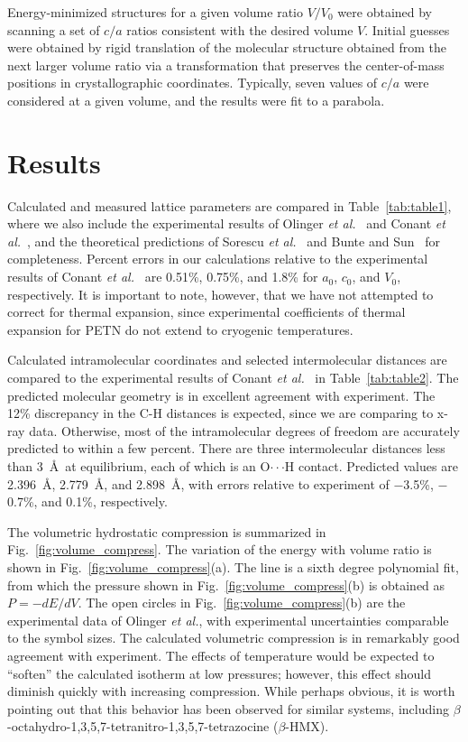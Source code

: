\documentclass[prb,aps,nobibnotes,twocolumn,doublespace,twocolumngrid,superbib]{revtex4}
\begin{document}
Energy-minimized structures for a given volume ratio $V/V_0$ were
obtained by scanning a set of $c/a$ ratios consistent with the desired
volume $V$.  Initial guesses were obtained by rigid translation of the
molecular structure obtained from the next larger volume ratio via a
transformation that preserves the center-of-mass positions in
crystallographic coordinates.  Typically, seven values of $c/a$ were
considered at a given volume, and the results were fit to a parabola.

\section{Results}
\label{sec:results}
Calculated and measured lattice parameters are compared in
Table~\ref{tab:table1}, where we also include the experimental results
of Olinger {\it et al.}~\cite{Olinger_1975v62} and Conant {\it et
al.}~\cite{Conant_1979}, and the theoretical predictions of Sorescu
{\it et al.}~\cite{Sorescu_1999v103} and Bunte and
Sun~\cite{Bunte_2000v104} for completeness.  Percent errors in our
calculations relative to the experimental results of Conant {\it et
al.}~\cite{Conant_1979} are 0.51\%, 0.75\%, and 1.8\% for $a_0$,
$c_0$, and $V_0$, respectively.  It is important to note, however,
that we have not attempted to correct for thermal expansion, since
experimental coefficients of thermal expansion for PETN do not extend
to cryogenic temperatures.

Calculated intramolecular coordinates and selected intermolecular
distances are compared to the experimental results of Conant {\it et
al.}~\cite{Conant_1979} in Table~\ref{tab:table2}.  The predicted
molecular geometry is in excellent agreement with experiment.  The
12\% discrepancy in the C-H distances is expected, since we are
comparing to x-ray data.  Otherwise, most of the intramolecular
degrees of freedom are accurately predicted to within a few percent.
There are three intermolecular distances less than 3~\AA\ at
equilibrium, each of which is an O$\cdot\cdot\cdot$H contact.
Predicted values are 2.396~\AA, 2.779~\AA, and 2.898~\AA, with errors
relative to experiment of $-$3.5\%, $-$0.7\%, and 0.1\%, respectively.

The volumetric hydrostatic compression is summarized in
Fig.~\ref{fig:volume_compress}.  The variation of the energy with
volume ratio is shown in Fig.~\ref{fig:volume_compress}(a).  The line
is a sixth degree polynomial fit, from which the pressure shown in
Fig.~\ref{fig:volume_compress}(b) is obtained as $P=-dE/dV$.  The open
circles in Fig.~\ref{fig:volume_compress}(b) are the experimental data
of Olinger {\it et al.}, with experimental uncertainties comparable to
the symbol sizes.  The calculated volumetric compression is in
remarkably good agreement with experiment.  The effects of temperature
would be expected to ``soften'' the calculated isotherm at low
pressures;  however, this effect should diminish quickly with
increasing compression. While perhaps obvious, it is worth pointing out
that this behavior has been observed for similar systems, including 
$\beta$-octahydro-1,3,5,7-tetranitro-1,3,5,7-tetrazocine
($\beta$-HMX)\cite{Gump_2003,Sewell03_unpublished}.
\end{document}
